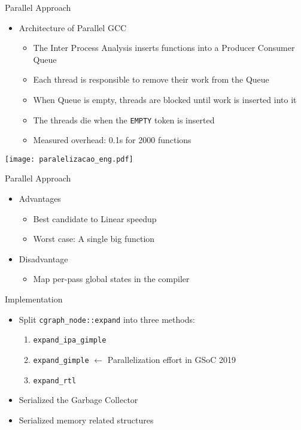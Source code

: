 \begin{frame}{Parallel Approach}
    \begin{itemize}
        \item Architecture of Parallel GCC
            \begin{itemize}
                \item The Inter Process Analysis inserts functions into a Producer Consumer Queue
                \item Each thread is responsible to remove their work from the Queue
                \item When Queue is empty, threads are blocked until work is inserted into it
                \item The threads die when the \texttt{EMPTY} token is inserted
                \item Measured overhead: 0.1s for 2000 functions
             \end{itemize}
\end{itemize}
 \centering
 \texttt{[image: paralelizacao\_eng.pdf]}
\end{frame}

\begin{frame}{Parallel Approach}
    \begin{itemize}
        \item Advantages
            \begin{itemize}
                \item Best candidate to Linear speedup
                \item Worst case: A single big function
            \end{itemize}
        \item Disadvantage
            \begin{itemize}
              \item Map per-pass global states in the compiler
            \end{itemize}
    \end{itemize}
\end{frame}

\begin{frame}{Implementation}
    \begin{itemize}
        \item Split \texttt{cgraph\_node::expand} into three methods:
            \begin{enumerate}
                \item \texttt{expand\_ipa\_gimple}
                \item \texttt{expand\_gimple} $\longleftarrow$ Parallelization effort in GSoC 2019
                \item \texttt{expand\_rtl}
            \end{enumerate}
        \item Serialized the Garbage Collector
        \item Serialized memory related structures
    \end{itemize}
\end{frame}

